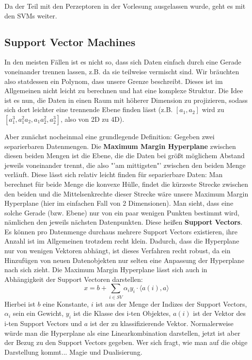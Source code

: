 Da der Teil mit den Perzeptoren in der Vorlesung ausgelassen wurde, geht 
es mit den SVMs weiter.

\subsection{Support Vector Machines}
In den meisten Fällen ist es nicht so, dass sich Daten einfach durch
eine Gerade voneinander trennen lassen, z.B. da sie teilweise vermischt 
sind. Wir bräuchten also statdessen ein Polynom, dass unsere Grenze 
beschreibt. Dieses ist im Allgemeinen nicht leicht zu berechnen und hat
eine komplexe Struktur. Die Idee ist es nun, die Daten in einen Raum
mit höherer Dimension zu projizieren, sodass sich dort leichter
eine trennende Ebene finden lässt (z.B. \([a_1,a_2]\) wird zu
\([a_1^3,a_1^2 a_2, a_1 a_2^2, a_2^3]\), also von 2D zu 4D).

Aber zunächst nocheinmal eine grundlegende Definition:
Gegeben zwei separierbaren Datenmengen. Die \textbf{Maximum
Margin Hyperplane} zwischen diesen beiden Mengen ist die Ebene, die
die Daten bei größt möglichem Abstand jeweils voneinander trennt, die 
also "'am mittigsten"' zwischen den beiden Menge verläuft. Diese lässt
sich relativ leicht finden für separierbare Daten: Man berechnet für beide
Menge die konvexe Hülle, findet die kürzeste Strecke zwischen den
beiden und die Mittelsenkrechte dieser Strecke wäre unsere Maximum
Margin Hyperplane (hier im einfachen Fall von 2 Dimensionen). Man sieht,
dass eine solche Gerade (bzw. Ebene) nur von ein paar wenigen Punkten
bestimmt wird, nämlichen den jeweils nächsten Datenpunkten.
Diese heißen \textbf{Support Vectors}. Es können pro Datenmenge
durchaus mehrere Support Vectors existieren, ihre Anzahl ist im 
Allgemeinen trotzdem recht klein. Dadurch, dass die Hyperplane nur von
wenigen Vektoren abhängt, ist dieses Verfahren recht robust, da 
ein Hinzufügen von neuen Datenobjekten nur selten eine Anpassung
der Hyperplane nach sich zieht. Die Maximum Margin Hyperplane lässt
sich auch in Abhängigkeit der Support Vectoren darstellen:
\[
x = b + \sum _{i \in SV} \alpha_i y_i \cdot \langle a(i),a \rangle
\]
Hierbei ist \(b\) eine Konstante, \(i\) ist aus der Menge der Indizes 
der Support Vectors, \(\alpha_i\) sein ein Gewicht, \(y_i\) ist die 
Klasse des i-ten Objektes, \(a(i)\) ist der Vektor des i-ten Support 
Vectors und \(a\) ist der zu klassifizierende Vektor. Normalerweise
würde man die Hyperplane als eine Linearkombination darstellen, jetzt
ist aber der Bezug zu den Support Vectors gegeben. Wer sich fragt,
wie man auf die obige Darstellung kommt... Magie und Dualisierung.

